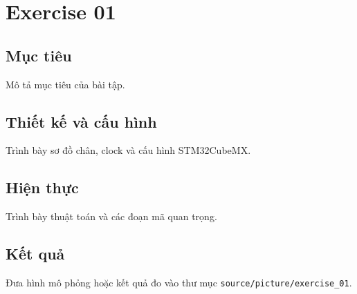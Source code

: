 \chapter{Exercise 01}
\section{Mục tiêu}
Mô tả mục tiêu của bài tập.
\section{Thiết kế và cấu hình}
Trình bày sơ đồ chân, clock và cấu hình STM32CubeMX.
\section{Hiện thực}
Trình bày thuật toán và các đoạn mã quan trọng.
\section{Kết quả}
Đưa hình mô phỏng hoặc kết quả đo vào thư mục \texttt{source/picture/exercise\_01}.
